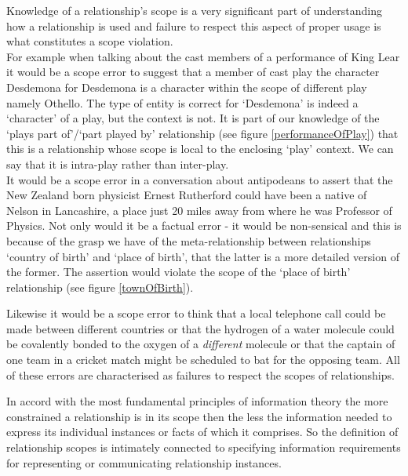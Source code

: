 \noindent Knowledge of a relationship's scope is a very significant part of understanding how a relationship is used and failure 
to respect this aspect of proper usage is what constitutes a scope violation. \\

\noindent For example when talking about the cast members of a performance of King Lear it would be a scope error to suggest that a 
member of cast play the character Desdemona for Desdemona is a character within the scope of different play namely Othello.  
The type of entity is correct for `Desdemona' is indeed a  `character' of a play, but the context is not. 
It is part of our knowledge of the `plays part of'/`part played by' relationship (see figure \ref{performanceOfPlay}) that this is a 
relationship whose scope is local to the enclosing `play' context. We can say that it is intra-play rather than inter-play. \\

\noindent It would be a scope error in a conversation about antipodeans to assert that the New Zealand born physicist Ernest Rutherford could have been a native of Nelson in Lancashire, a place just 20 miles away from where he was Professor of Physics. 
Not only would it be a factual error - it would be non-sensical and this is because of the grasp we have of the meta-relationship between relationships `country of birth' and `place of birth', that the latter is a more detailed version of the former. 
The assertion would violate the scope of the `place of birth' relationship (see figure \ref{townOfBirth}).\\


\noindent Likewise it would be a scope error to think that a local telephone call could be made between different countries or that the hydrogen of a water molecule could be covalently bonded to the oxygen of a \textit{different} molecule or that the captain of one team in a cricket match might be scheduled to bat for the opposing team. All of these errors are characterised as failures to respect the scopes of relationships. \\



\noindent In accord with the most fundamental principles of information theory the more constrained a relationship is in its scope then the less the information needed to express its individual instances or
facts of which it comprises. 
So the definition of relationship scopes is intimately connected to specifying information requirements for representing or communicating relationship instances. \\

